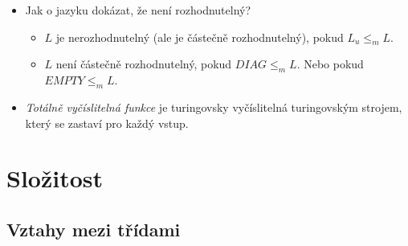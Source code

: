 \documentclass{article}
\theoremstyle{plain}
\theoremstyle{plain}
\theoremstyle{remark}
\begin{document}
\begin{itemize}
  \item Jak o jazyku dokázat, že není rozhodnutelný?
  \begin{itemize}
    \item $L$ je nerozhodnutelný (ale je částečně rozhodnutelný), pokud
    $L_u \leq_m L$.

    \item $L$ není částečně rozhodnutelný, pokud $DIAG \leq_m L$. Nebo pokud
    $EMPTY \leq_m L$.
  \end{itemize}

  \item \emph{Totálně vyčíslitelná funkce} je turingovsky vyčíslitelná
  turingovským strojem, který se zastaví pro každý vstup.
\end{itemize}

\section{Složitost}
\subsection{Vztahy mezi třídami}
\end{document}
